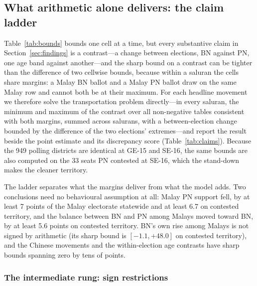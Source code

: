 \documentclass[11pt]{article}
\begin{document}
\subsection{What arithmetic alone delivers: the claim ladder}
\label{sec:strategy-ladder}

Table~\ref{tab:bounds} bounds one cell at a time, but every substantive claim in Section~\ref{sec:findings} is a contrast---a change between elections, BN against PN, one age band against another---and the sharp bound on a contrast can be tighter than the difference of two cellwise bounds, because within a saluran the cells share margins: a Malay BN ballot and a Malay PN ballot draw on the same Malay row and cannot both be at their maximum. For each headline movement we therefore solve the transportation problem directly---in every saluran, the minimum and maximum of the contrast over all non-negative tables consistent with both margins, summed across salurans, with a between-election change bounded by the difference of the two elections' extremes---and report the result beside the point estimate and its discrepancy score (Table~\ref{tab:claims}). Because the 949 polling districts are identical at GE-15 and SE-16, the same bounds are also computed on the 33 seats PN contested at SE-16, which the stand-down makes the cleaner territory.



The ladder separates what the margins deliver from what the model adds. Two conclusions need no behavioural assumption at all: Malay PN support fell, by at least 7 points of the Malay electorate statewide and at least 6.7 on contested territory, and the balance between BN and PN among Malays moved toward BN, by at least 5.6 points on contested territory. BN's own rise among Malays is not signed by arithmetic (its sharp bound is $[-1.1, +48.0]$ on contested territory), and the Chinese movements and the within-election age contrasts have sharp bounds spanning zero by tens of points.

\subsubsection*{The intermediate rung: sign restrictions}
\end{document}
